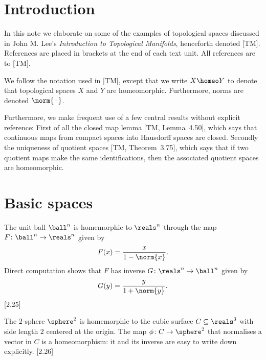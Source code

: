 \documentclass[article, a4paper, 11pt, oneside]{memoir}
\title{\doctitle}
\author{\docauthor}
\numberwithin{equation}{chapter}
\begin{document}
\maketitle

\chapter{Introduction}

In this note we elaborate on some of the examples of topological spaces discussed in John M. Lee's \emph{Introduction to Topological Manifolds}, henceforth denoted [TM]. References are placed in brackets at the end of each text unit. All references are to [TM].

We follow the notation used in [TM], except that we write $X \homeo Y $ to denote that topological spaces $X$ and $Y$ are homeomorphic. Furthermore, norms are denoted $\norm{\,\cdot\,}$.

Furthermore, we make frequent use of a few central results without explicit reference: First of all the closed map lemma [TM, Lemma~4.50], which says that continuous maps from compact spaces into Hausdorff spaces are closed. Secondly the uniqueness of quotient spaces [TM, Theorem~3.75], which says that if two quotient maps make the same identifications, then the associated quotient spaces are homeomorphic.


\chapter{Basic spaces}

\begin{example}
    The unit ball $\ball^n$ is homemorphic to $\reals^n$ through the map $F \colon \ball^n \to \reals^n$ given by
    \begin{equation*}
        F(x) = \frac{x}{1 - \norm{x}}.
    \end{equation*}
    Direct computation shows that $F$ has inverse $G \colon \reals^n \to \ball^n$ given by
    \begin{equation*}
        G(y) = \frac{y}{1 + \norm{y}}.
    \end{equation*}
    [2.25]
\end{example}


\begin{example}
    The $2$-sphere $\sphere^2$ is homemorphic to the cubic surface $C \subseteq \reals^3$ with side length $2$ centered at the origin. The map $\phi \colon C \to \sphere^2$ that normalises a vector in $C$ is a homeomorphism: it and its inverse are easy to write down explicitly. [2.26]
\end{example}
\end{document}
